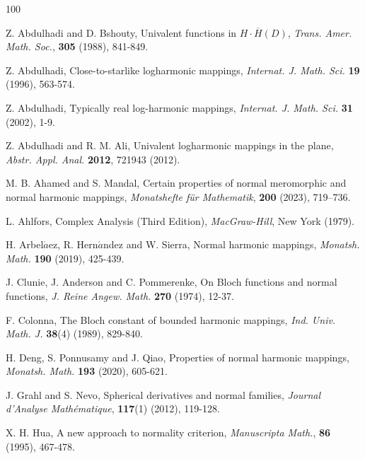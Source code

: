 \documentclass[a4paper,12pt]{amsart}
\theoremstyle{plain}
\theoremstyle{definition}
\begin{document}
\begin{thebibliography}{100}
	
	  {\sc Z. Abdulhadi} and {\sc D. Bshouty}, Univalent functions in $H\cdot\overline{H}(D)$, \textit{Trans. Amer. Math. Soc.}, \textbf{305} (1988), 841-849.
	 
	  {\sc Z. Abdulhadi}, Close-to-starlike logharmonic mappings, \textit{Internat. J. Math. Sci.} \textbf{19} (1996), 563-574.
	 
	  {\sc Z. Abdulhadi}, Typically real log-harmonic mappings, \textit{Internat. J. Math. Sci.} \textbf{31} (2002), 1-9.
	
	  {\sc Z. Abdulhadi} and {\sc R. M.  Ali}, Univalent logharmonic mappings in the plane, \textit{Abstr. Appl. Anal.} \textbf{2012}, 721943 (2012).
	
	 {\sc M. B. Ahamed} and {\sc S. Mandal}, Certain properties of normal meromorphic and normal harmonic mappings, \textit{Monatshefte für Mathematik}, \textbf{200} (2023), 719–736.
	
	 {\sc L. Ahlfors}, Complex Analysis (Third Edition), \textit{MacGraw-Hill}, New York (1979).
	
	 {\sc H. Arbel$ \acute{a} $ez}, {\sc R. Hern$ \acute{a} $ndez} and {\sc W. Sierra}, Normal harmonic mappings, \textit{Monatsh. Math.} \textbf{190} (2019), 425-439.
	
	 {\sc J. Clunie, J. Anderson} and {\sc C. Pommerenke}, On Bloch functions and normal functions, \textit{J. Reine Angew. Math.} \textbf{270} (1974), 12-37.
	
	 {\sc F. Colonna}, The Bloch constant of bounded harmonic mappings, \textit{Ind. Univ. Math. J.} \textbf{38}(4) (1989), 829-840.
	
	 {\sc H. Deng, S.  Ponnusamy} and {\sc J. Qiao}, Properties of normal harmonic mappings, \textit{Monatsh. Math.} \textbf{193} (2020), 605-621.
	
	  {\sc J. Grahl} and {\sc S. Nevo}, Spherical derivatives and normal families, \textit{Journal d’Analyse Math\'ematique}, \textbf{117}(1) (2012), 119-128.	
	
	 {\sc X. H. Hua}, A new approach to normality criterion, \textit{Manuscripta Math.}, \textbf{86} (1995), 467-478.
	

\end{thebibliography}
\end{document}
